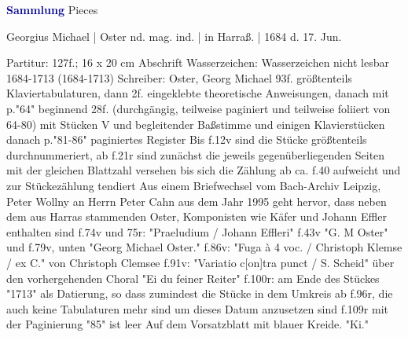 \documentclass[twocolumn]{book}
\begin{document}
\newline \par \vspace{7pt} \textcolor{darkblue}{\textbf{Sammlung}}
 Pieces
\newline \begin{itshape} Georgius Michael | Oster nd. mag. ind. | in Harraß. | 1684 d. 17. Jun.\end{itshape} 
\newline \textcolor{darkblue}{}  Partitur: 127f.; 16 x 20 cm
\newline Abschrift
\newline Wasserzeichen: Wasserzeichen nicht lesbar  1684-1713 (1684-1713)
\newline Schreiber: Oster, Georg Michael
\newline 93f. größtenteils Klaviertabulaturen, dann 2f. eingeklebte theoretische Anweisungen, danach mit p."64" beginnend 28f. (durchgängig, teilweise paginiert und teilweise foliiert von 64-80) mit Stücken V und begleitender Baßstimme und einigen Klavierstücken danach p."81-86" paginiertes Register
\newline Bis f.12v sind die Stücke größtenteils durchnummeriert, ab f.21r sind zunächst die jeweils gegenüberliegenden Seiten mit der gleichen Blattzahl versehen bis sich die Zählung ab ca. f.40 aufweicht und zur Stückezählung tendiert
\newline Aus einem Briefwechsel vom Bach-Archiv Leipzig, Peter Wollny an Herrn Peter Cahn aus dem Jahr 1995 geht hervor, dass neben dem aus Harras stammenden Oster, Komponisten wie Käfer und Johann Effler enthalten sind
\newline f.74v und 75r: "Praeludium / Johann Effleri"
\newline f.43v "G. M Oster" und f.79v, unten "Georg Michael Oster."
\newline f.86v: "Fuga à 4 voc. / Christoph Klemse / ex C." von Christoph Clemsee
\newline f.91v: "Variatio c[on]tra punct / S. Scheid" über den vorhergehenden Choral "Ei du feiner Reiter"
\newline f.100r: am Ende des Stückes "1713" als Datierung, so dass zumindest die Stücke in dem Umkreis ab f.96r, die auch keine Tabulaturen mehr sind um dieses Datum anzusetzen sind
\newline f.109r mit der Paginierung "85" ist leer
\newline Auf dem Vorsatzblatt mit blauer Kreide. "Ki."
\end{document}

